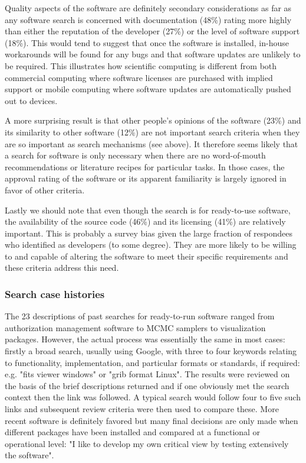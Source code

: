 \documentclass{casicswhitepaper}
\begin{document}
Quality aspects of the software are definitely secondary considerations as far as any software search is concerned with documentation (48\%) rating more highly than either the reputation of the developer (27\%) or the level of software support (18\%). This would tend to suggest that once the software is installed, in-house workarounds will be found for any bugs and that software updates are unlikely to be required. This illustrates how scientific computing is different from both commercial computing where software licenses are purchased with implied support or mobile computing where software updates are automatically pushed out to devices. 

A more surprising result is that other people's opinions of the software (23\%) and its similarity to other software (12\%) are not important search criteria when they are so important as search mechanisms (see above). It therefore seems likely that a search for software is only necessary when there are no word-of-mouth recommendations or literature recipes for particular tasks. In those cases, the approval rating of the software or its apparent familiarity is largely ignored in favor of other criteria.

Lastly we should note that even though the search is for ready-to-use software, the availability of the source code (46\%) and its licensing (41\%) are relatively important. This is probably a survey bias given the large fraction of respondees who identified as developers (to some degree). They are more likely to be willing to and capable of altering the software to meet their specific requirements and these criteria address this need.

\subsubsection{Search case histories}

The 23 descriptions of past searches for ready-to-run software ranged from authorization management software to MCMC samplers to visualization packages. However, the actual process was essentially the same in most cases: firstly a broad search, usually using Google, with three to four keywords relating to functionality, implementation, and particular formats or standards, if required: e.g. "fits viewer windows" or "grib format Linux". The results were reviewed on the basis of the brief descriptions returned and if one obviously met the search context then the link was followed. A typical search would follow four to five such links and subsequent review criteria were then used to compare these. More recent software is definitely favored but many final decisions are only made when different packages have been installed and compared at a functional or operational level: "I like to develop my own critical view by testing extensively the software".
\end{document}
